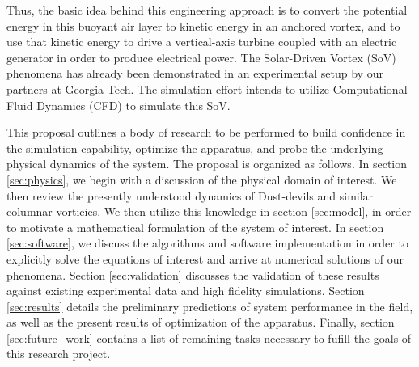 Thus, the basic idea behind this engineering approach is to convert the 
potential energy in this buoyant air layer to kinetic energy in an
anchored vortex, and to use that kinetic energy to drive a
vertical-axis turbine coupled with an electric generator in order to
produce electrical power. 
The Solar-Driven Vortex (SoV) phenomena has already been demonstrated in
an experimental setup by our partners at Georgia Tech. The simulation
effort intends to utilize Computational Fluid Dynamics (CFD) to simulate
this SoV. 
%
%


This proposal outlines a body of research to be performed to build
confidence in the simulation capability, optimize the apparatus, and 
probe the underlying physical dynamics of the system. 
The proposal is organized as follows. In section \ref{sec:physics}, we
begin with a discussion of the physical domain of interest. We then
review the presently understood dynamics of Dust-devils and similar
columnar vorticies. We then utilize this knowledge in section
\ref{sec:model}, in order to motivate a mathematical formulation of the
system of interest. In section \ref{sec:software}, we discuss the 
algorithms and software implementation in order to explicitly solve the
equations of interest and arrive at numerical solutions of our
phenomena. Section \ref{sec:validation} discusses the validation of
these results against existing experimental data and high fidelity
simulations.  Section \ref{sec:results} details the preliminary
predictions of system performance in the field, as well as the
present results of optimization of the apparatus. Finally, section
\ref{sec:future_work} contains a list of remaining tasks necessary to
fufill the goals of this research project. 




